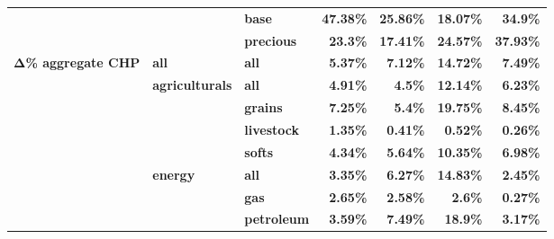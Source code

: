 \documentclass[
  authoryear,
  preprint,
  3p]{elsarticle}
\begin{document}
\begin{longtable}[t]{>{}l>{}l>{}l>{}r>{}r>{}r>{}r}
\textbf{} & \textbf{} & \textbf{base} & \textcolor[HTML]{4285f4}{\textbf{47.38\%}} & \textcolor[HTML]{4285f4}{\textbf{25.86\%}} & \textcolor[HTML]{4285f4}{\textbf{18.07\%}} & \textcolor[HTML]{4285f4}{\textbf{34.9\%}}\\
\addlinespace
\textbf{} & \textbf{} & \textbf{precious} & \textcolor[HTML]{4285f4}{\textbf{23.3\%}} & \textcolor[HTML]{4285f4}{\textbf{17.41\%}} & \textcolor[HTML]{4285f4}{\textbf{24.57\%}} & \textcolor[HTML]{4285f4}{\textbf{37.93\%}}\\
\textbf{Δ\% aggregate CHP} & \textbf{all} & \textbf{all} & \textcolor[HTML]{4285f4}{\textbf{5.37\%}} & \textcolor[HTML]{4285f4}{\textbf{7.12\%}} & \textcolor[HTML]{4285f4}{\textbf{14.72\%}} & \textcolor[HTML]{4285f4}{\textbf{7.49\%}}\\
\textbf{} & \textbf{agriculturals} & \textbf{all} & \textcolor[HTML]{4285f4}{\textbf{4.91\%}} & \textcolor[HTML]{4285f4}{\textbf{4.5\%}} & \textcolor[HTML]{4285f4}{\textbf{12.14\%}} & \textcolor[HTML]{4285f4}{\textbf{6.23\%}}\\
\textbf{} & \textbf{} & \textbf{grains} & \textcolor[HTML]{4285f4}{\textbf{7.25\%}} & \textcolor[HTML]{4285f4}{\textbf{5.4\%}} & \textcolor[HTML]{4285f4}{\textbf{19.75\%}} & \textcolor[HTML]{4285f4}{\textbf{8.45\%}}\\
\textbf{} & \textbf{} & \textbf{livestock} & \textcolor[HTML]{4285f4}{\textbf{1.35\%}} & \textcolor[HTML]{4285f4}{\textbf{0.41\%}} & \textcolor[HTML]{4285f4}{\textbf{0.52\%}} & \textcolor[HTML]{4285f4}{\textbf{0.26\%}}\\
\addlinespace
\textbf{} & \textbf{} & \textbf{softs} & \textcolor[HTML]{4285f4}{\textbf{4.34\%}} & \textcolor[HTML]{4285f4}{\textbf{5.64\%}} & \textcolor[HTML]{4285f4}{\textbf{10.35\%}} & \textcolor[HTML]{4285f4}{\textbf{6.98\%}}\\
\textbf{} & \textbf{energy} & \textbf{all} & \textcolor[HTML]{4285f4}{\textbf{3.35\%}} & \textcolor[HTML]{4285f4}{\textbf{6.27\%}} & \textcolor[HTML]{4285f4}{\textbf{14.83\%}} & \textcolor[HTML]{4285f4}{\textbf{2.45\%}}\\
\textbf{} & \textbf{} & \textbf{gas} & \textcolor[HTML]{4285f4}{\textbf{2.65\%}} & \textcolor[HTML]{4285f4}{\textbf{2.58\%}} & \textcolor[HTML]{4285f4}{\textbf{2.6\%}} & \textcolor[HTML]{4285f4}{\textbf{0.27\%}}\\
\textbf{} & \textbf{} & \textbf{petroleum} & \textcolor[HTML]{4285f4}{\textbf{3.59\%}} & \textcolor[HTML]{4285f4}{\textbf{7.49\%}} & \textcolor[HTML]{4285f4}{\textbf{18.9\%}} & \textcolor[HTML]{4285f4}{\textbf{3.17\%}}\\

\end{longtable}
\end{document}

